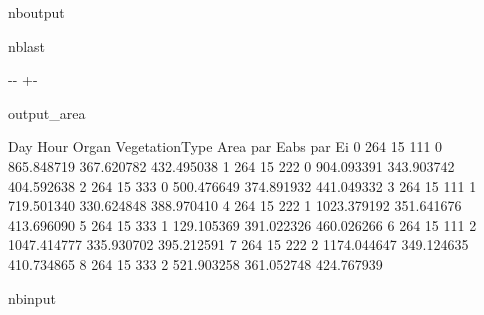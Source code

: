 \documentclass[letterpaper,10pt,english]{sphinxmanual}
\begin{document}
\begin{sphinxuseclass}{nboutput}
\begin{sphinxuseclass}{nblast}
{

\kern-\sphinxverbatimsmallskipamount\kern-\baselineskip
\kern+\FrameHeightAdjust\kern-\fboxrule
\vspace{\nbsphinxcodecellspacing}

\begin{sphinxuseclass}{output_area}
\begin{sphinxuseclass}{}


\begin{sphinxVerbatim}[commandchars=\\\{\}]
   Day  Hour  Organ  VegetationType         Area    par Eabs      par Ei
0  264    15    111               0   865.848719  367.620782  432.495038
1  264    15    222               0   904.093391  343.903742  404.592638
2  264    15    333               0   500.476649  374.891932  441.049332
3  264    15    111               1   719.501340  330.624848  388.970410
4  264    15    222               1  1023.379192  351.641676  413.696090
5  264    15    333               1   129.105369  391.022326  460.026266
6  264    15    111               2  1047.414777  335.930702  395.212591
7  264    15    222               2  1174.044647  349.124635  410.734865
8  264    15    333               2   521.903258  361.052748  424.767939
\end{sphinxVerbatim}



\end{sphinxuseclass}
\end{sphinxuseclass}
}

\end{sphinxuseclass}
\end{sphinxuseclass}
\begin{sphinxuseclass}{nbinput}
{
\begin{sphinxVerbatim}[commandchars=\\\{\}]
\llap{\color{nbsphinxin}[25]:\,\hspace{\fboxrule}\hspace{\fboxsep}}
              
             
              
\end{sphinxVerbatim}
}

\end{sphinxuseclass}
\end{document}
